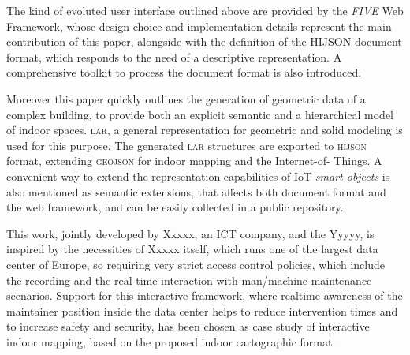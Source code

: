 The kind of evoluted user interface outlined above are provided by the
\emph{FIVE} Web Framework, whose design choice and implementation details
represent the main contribution of this paper, alongside with the definition
of the HIJSON document format, which responds to the need of a descriptive
representation. A comprehensive toolkit to process the document format is also
introduced.

Moreover this paper quickly outlines the generation of geometric data of a
complex building, to provide both an explicit semantic and a hierarchical
model of indoor spaces. \textsc{\large lar}, a general representation for
geometric and solid modeling is used for this purpose. The generated
\textsc{\large lar} structures are exported to \textsc{\large hijson} format,
extending \textsc{\large geojson} for indoor mapping and the Internet-of-
Things. A convenient way to extend the representation capabilities of IoT
\emph{smart objects} is also mentioned as semantic extensions, that affects
both document format and the web framework, and can be easily collected in a
public repository.




This work, jointly developed by Xxxxx, an ICT company, and the Yyyyy, is inspired by the
necessities of Xxxxx itself, which runs one of the largest data center of
Europe, so requiring very strict access control policies, which include the
recording and the real-time interaction with man/machine maintenance
scenarios. Support for this interactive framework, where realtime awareness of
the maintainer position inside the data center helps to reduce intervention
times and to increase safety and security, has been chosen as case study of
interactive indoor mapping, based on the proposed indoor cartographic format.


